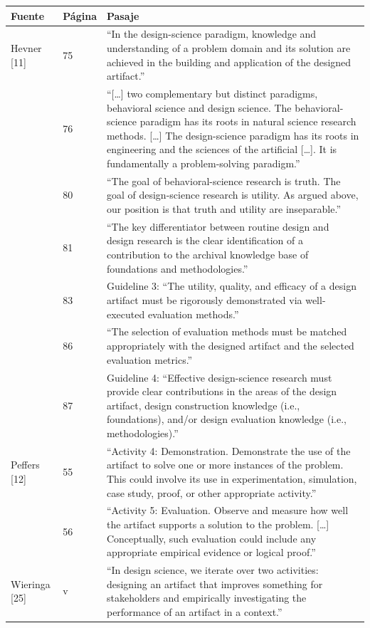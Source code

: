 \documentclass[11pt,a4paper]{article}
\begin{document}
{\small
\begin{longtable}{@{}L{2.4cm}L{1.2cm}L{12.2cm}@{}}
\toprule
\textbf{Fuente} & \textbf{Página} & \textbf{Pasaje}\\
\midrule\endhead
\bottomrule\endfoot
Hevner [11] & 75 & “In the design-science paradigm, knowledge and understanding of a problem domain and its solution are achieved in the building and application of the designed artifact.”\\
 & 76 & “[\ldots] two complementary but distinct paradigms, behavioral science and design science. The behavioral-science paradigm has its roots in natural science research methods. [\ldots] The design-science paradigm has its roots in engineering and the sciences of the artificial [\ldots]. It is fundamentally a problem-solving paradigm.”\\
 & 80 & “The goal of behavioral-science research is truth. The goal of design-science research is utility. As argued above, our position is that truth and utility are inseparable.”\\
 & 81 & “The key differentiator between routine design and design research is the clear identification of a contribution to the archival knowledge base of foundations and methodologies.”\\
 & 83 & Guideline 3: “The utility, quality, and efficacy of a design artifact must be rigorously demonstrated via well-executed evaluation methods.”\\
 & 86 & “The selection of evaluation methods must be matched appropriately with the designed artifact and the selected evaluation metrics.”\\
 & 87 & Guideline 4: “Effective design-science research must provide clear contributions in the areas of the design artifact, design construction knowledge (i.e., foundations), and/or design evaluation knowledge (i.e., methodologies).”\\
\midrule
Peffers [12] & 55 & “Activity 4: Demonstration. Demonstrate the use of the artifact to solve one or more instances of the problem. This could involve its use in experimentation, simulation, case study, proof, or other appropriate activity.”\\
 & 56 & “Activity 5: Evaluation. Observe and measure how well the artifact supports a solution to the problem. [\ldots] Conceptually, such evaluation could include any appropriate empirical evidence or logical proof.”\\
\midrule
Wieringa [25] & v & “In design science, we iterate over two activities: designing an artifact that improves something for stakeholders and empirically investigating the performance of an artifact in a context.”\\

\end{longtable}}
\end{document}
